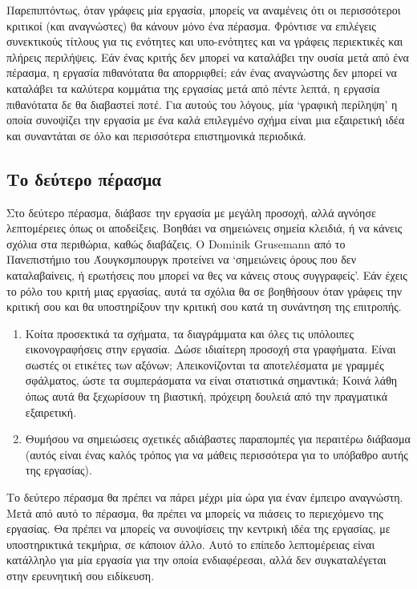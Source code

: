 \documentclass{article}
\begin{document}
\par
Παρεπιπτόντως, όταν γράφεις μία εργασία, μπορείς να αναμένεις ότι οι περισσότεροι κριτικοί (και αναγνώστες) θα κάνουν μόνο ένα πέρασμα. Φρόντισε να επιλέγεις συνεκτικούς τίτλους για τις ενότητες και υπο-ενότητες και να γράφεις περιεκτικές και πλήρεις περιλήψεις. Εάν ένας κριτής δεν μπορεί να καταλάβει την ουσία μετά από ένα πέρασμα, η εργασία πιθανότατα θα απορριφθεί; εάν ένας αναγνώστης δεν μπορεί να καταλάβει τα καλύτερα κομμάτια της εργασίας μετά από πέντε λεπτά, η εργασία πιθανότατα δε θα διαβαστεί ποτέ. Για αυτούς του λόγους, μία \textquoteleft γραφική περίληψη\textlatin{'} η οποία συνοψίζει την εργασία με ένα καλά επιλεγμένο σχήμα είναι μια εξαιρετική ιδέα και συναντάται σε όλο και περισσότερα επιστημονικά περιοδικά.
\subsection{Το δεύτερο πέρασμα}
\par
Στο δεύτερο πέρασμα, διάβασε την εργασία με μεγάλη προσοχή, αλλά αγνόησε λεπτομέρειες όπως οι αποδείξεις. Βοηθάει να σημειώνεις σημεία κλειδιά, ή να κάνεις σχόλια στα περιθώρια, καθώς διαβάζεις. Ο \textlatin{Dominik Grusemann} από το Πανεπιστήμιο του Άουγκσμπουργκ προτείνει να \enquote*{σημειώνεις όρους που δεν καταλαβαίνεις, ή ερωτήσεις που μπορεί να θες να κάνεις στους συγγραφείς}. Εάν έχεις το ρόλο του κριτή μιας εργασίας, αυτά τα σχόλια θα σε βοηθήσουν όταν γράφεις την κριτική σου και θα υποστηρίξουν την κριτική σου κατά τη συνάντηση της επιτροπής.
\begin{enumerate}
    \item Κοίτα προσεκτικά τα σχήματα, τα διαγράμματα και όλες τις υπόλοιπες εικονογραφήσεις στην εργασία. Δώσε ιδιαίτερη προσοχή στα γραφήματα. Είναι σωστές οι ετικέτες των αξόνων\textlatin{;} Απεικονίζονται τα αποτελέσματα με γραμμές σφάλματος, ώστε τα συμπεράσματα να είναι στατιστικά σημαντικά\textlatin{;} Κοινά λάθη όπως αυτά θα ξεχωρίσουν τη βιαστική, πρόχειρη δουλειά από την πραγματικά εξαιρετική.
    \item Θυμήσου να σημειώσεις σχετικές αδιάβαστες παραπομπές για περαιτέρω διάβασμα (αυτός είναι ένας καλός τρόπος για να μάθεις περισσότερα για το υπόβαθρο αυτής της εργασίας).
\end{enumerate}
\par
Το δεύτερο πέρασμα θα πρέπει να πάρει μέχρι μία ώρα για έναν έμπειρο αναγνώστη. Μετά από αυτό το πέρασμα, θα πρέπει να μπορείς να πιάσεις το περιεχόμενο της εργασίας. Θα πρέπει να μπορείς να συνοψίσεις την κεντρική ιδέα της εργασίας, με υποστηρικτικά τεκμήρια, σε κάποιον άλλο. Αυτό το επίπεδο λεπτομέρειας είναι κατάλληλο για μία εργασία για την οποία ενδιαφέρεσαι, αλλά δεν συγκαταλέγεται στην ερευνητική σου ειδίκευση.
\end{document}
